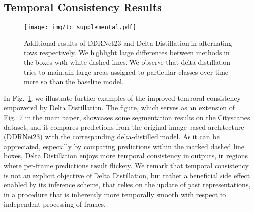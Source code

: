 \documentclass[runningheads]{llncs}
\begin{document}
\subsection{Temporal Consistency Results}
\begin{figure}[tbh]
    \centering
    \texttt{[image: img/tc\_supplemental.pdf]}
    \caption{Additional results of DDRNet23 and Delta Distillation in alternating rows respectively. We highlight large differences between methods in the boxes with white dashed lines. We observe that delta distillation tries to maintain large areas assigned to particular classes over time more so than the baseline model.}
    \label{fig:tc_supplemental}
\end{figure} In Fig.~\ref{fig:tc_supplemental}, we illustrate further examples of the improved temporal consistency empowered by Delta Distillation. 
The figure, which serves as an extension of Fig.~7 in the main paper, showcases some segmentation results on the Cityscapes dataset, and it compares predictions from the original image-based architecture (DDRNet23) with the corresponding delta-distilled model.
As it can be appreciated, especially by comparing predictions within the marked dashed line boxes, Delta Distillation enjoys more temporal consistency in outputs, in regions where per-frame predictions result flickery.
We remark that temporal consistency is not an explicit objective of Delta Distillation, but rather a beneficial side effect enabled by its inference scheme, that relies on the update of past representations, in a procedure that is inherently more temporally smooth with respect to independent processing of frames.
\end{document}
